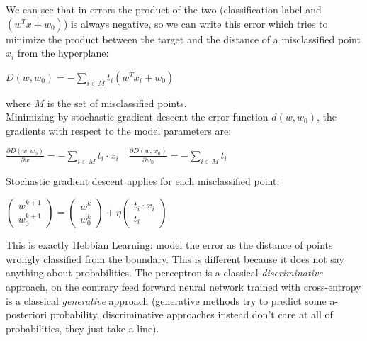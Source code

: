 
We can see that in errors the product of the two (classification label and $\left(w^{T} x+w_{0}\right)$) is always negative, so we can write this error which tries to minimize the product between the target and the distance of a misclassified point $x_i$ from the hyperplane:
\begin{center}
    $D\left(w, w_{0}\right)=-\sum_{i \in M} t_{i}\left(w^{T} x_{i}+w_{0}\right)$
\end{center}
where $M$ is the set of misclassified points. \\

Minimizing by stochastic gradient descent the error function $d(w,w_0)$, the gradients with respect to the model parameters are:
\begin{center}
    $\frac{\partial D\left(w, w_{0}\right)}{\partial w}=-\sum_{i \in M} t_{i} \cdot x_{i} \quad \frac{\partial D\left(w, w_{0}\right)}{\partial w_{0}}=-\sum_{i \in M} t_{i}$
\end{center}
Stochastic gradient descent applies for each misclassified point:
\begin{center}
    $\left(\begin{array}{l}{w^{k+1}} \\ {w_{0}^{k+1}}\end{array}\right)=\left(\begin{array}{l}{w^{k}} \\ {w_{0}^{k}}\end{array}\right)+\eta\left(\begin{array}{c}{t_{i} \cdot x_{i}} \\ {t_{i}}\end{array}\right)$
\end{center}
This is exactly Hebbian Learning:
model the error as the distance of points wrongly classified from the boundary. This is different because it does not say anything about probabilities. The perceptron is a classical \textit{discriminative} approach, on the contrary feed forward neural network trained with cross-entropy is a classical \textit{generative} approach (generative methods try to predict some a-posteriori probability, discriminative approaches instead don't care at all of probabilities, they just take a line).


